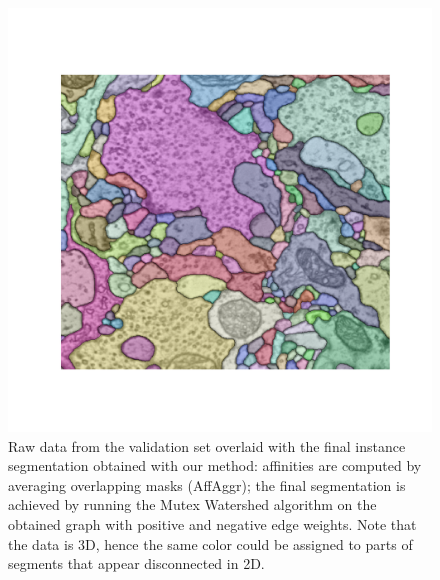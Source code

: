 
\begin{figure}[t]
\centering
        \includegraphics[width=\textwidth,trim=1.80in 1.4in 1.8in 1.50in,clip]{./figs/MWS_segm.pdf} %
        \caption{Raw data from the validation set overlaid with the final instance segmentation obtained with our method: affinities are computed by averaging overlapping masks (AffAggr); the final segmentation is achieved by running the Mutex Watershed algorithm on the obtained graph with positive and negative edge weights. Note that the data is 3D, hence the same color could be assigned to parts of segments that appear disconnected in 2D.}
    \label{fig:MWS_segm}
\end{figure}


